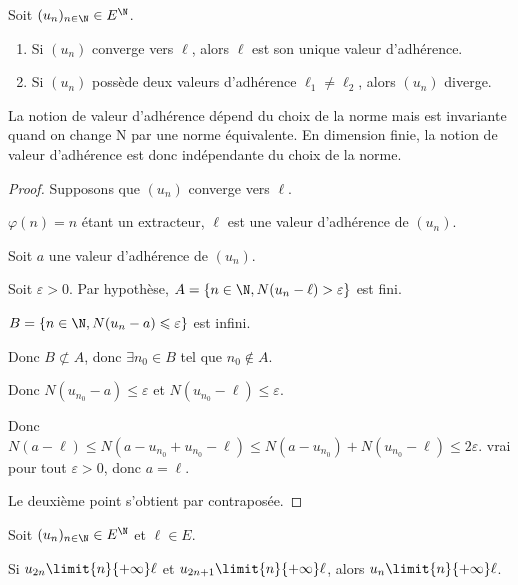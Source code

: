 \begin{proposition}{}{}
    Soit $(u_n)_{n \in \N} \in E^{\N}$. 

    \begin{enumerate}
        \item Si $(u_n)$ converge vers $\ell$, alors $\ell$ est son unique valeur d'adhérence. 
        \item Si $(u_n)$ possède deux valeurs d'adhérence $\ell_1 \neq \ell_2$, alors $(u_n)$ diverge.
    \end{enumerate}
\end{proposition}

\begin{remarque}
    La notion de valeur d'adhérence dépend du choix de la norme mais est invariante 
    quand on change N par une norme équivalente. En dimension finie, la notion de valeur d'adhérence
    est donc indépendante du choix de la norme. 
\end{remarque}


\begin{proof}
    Supposons que $(u_n)$ converge vers $\ell$.

    $\varphi(n) =n$ étant un extracteur, $\ell$ est une valeur d'adhérence de $(u_n)$.

    \svspace Soit $a$ une valeur d'adhérence de $(u_n)$.
    
    Soit $\varepsilon > 0$. Par hypothèse, $A = \{n \in \N, N(u_n - \ell) > \varepsilon\}$ est 
    fini. 

    $B = \{n \in \N, N(u_n - a) \leqslant \varepsilon \}$ est infini. 

    Donc $B \not\subset A$, donc $\exists n_0 \in B$ tel que $n_0 \not\in A$.

    Donc $N(u_{n_0} - a) \leqslant \varepsilon$ et $N(u_{n_0} - \ell) \leqslant \varepsilon$.

    Donc $N(a - \ell) \leqslant N(a - u_{n_0} + u_{n_0} - \ell) \leqslant N(a - u_{n_0}) + N(u_{n_0} - \ell) \leqslant 2\varepsilon$.
    vrai pour tout $\varepsilon > 0$, donc $a = \ell$.

    Le deuxième point s'obtient par contraposée.
\end{proof}

\begin{proposition}{}{}
    Soit $(u_n)_{n \in \N} \in E^{\N}$ et $\ell \in E$.

    Si $u_{2n} \limit{n}{+\infty} \ell$ et $u_{2n + 1} \limit{n}{+\infty} \ell$, alors
    $u_n \limit{n}{+\infty} \ell$.
\end{proposition}

